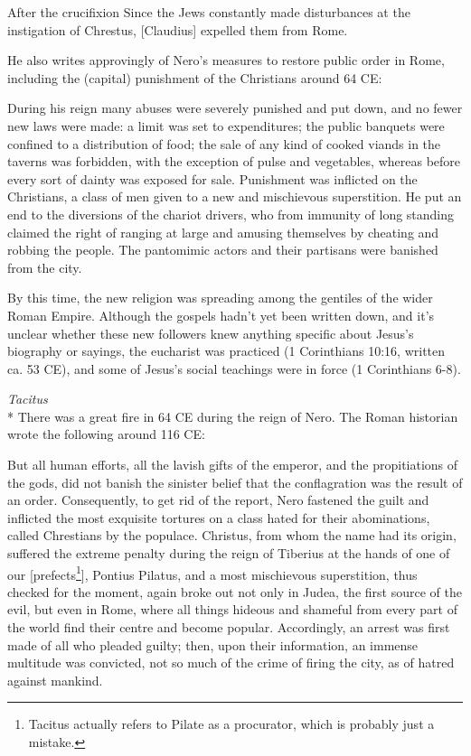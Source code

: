 \documentclass[10pt,a5paper,twoside]{article}
\newcommand{\doimage}[2]{\texttt{[image: \#2]}\label{fig:#2}}
\newcommand{\figbasic}[4]{ %
    \ifthenelse{\isodd{\pageref{fig:#2}}}{}{\hfill}
    \ifstrempty{#3}{
      \doimage{#1}{#2}
    }{
      \makebox{\doimage{#1}{#2} \\ #3}
    }
    \ifthenelse{\isodd{\pageref{fig:#2}}}{\hfill}{}
    \par
}
\newcommand{\fig}[2][0.4]{
  \figbasic{#1}{#2}{}{}
}
\newcommand{\quotesize}{\normalsize{}}
\newcommand{\comm}[1]{\begingroup \color{black!50} #1\endgroup}
\newenvironment{quotetext}{\begingroup\quotesize}{\endgroup}
\newcommand{\intex}[1]{\index[texts]{#1}}
\newcommand{\reftex}[1]{#1\intex{#1}}
\newcommand{\subhead}[1]{\emph{#1}\\*}
\begin{document}
\begin{section}{After the crucifixion}
\begin{quotetext}
Since the Jews constantly made disturbances at the instigation of Chrestus, [Claudius] expelled them from Rome.
\end{quotetext}

\comm{He also writes approvingly of Nero's measures to
restore public order in Rome, including the (capital) punishment of the Christians around 64 CE:}

\begin{quotetext}
During his reign many abuses were severely punished and put down, and
no fewer new laws were made: a limit was set to expenditures; the
public banquets were confined to a distribution of food; the sale of
any kind of cooked viands in the taverns was forbidden, with the
exception of pulse and vegetables, whereas before every sort of dainty
was exposed for sale. Punishment was inflicted on the Christians, a
class of men given to a new and mischievous superstition. He put an
end to the diversions of the chariot drivers, who from immunity of
long standing claimed the right of ranging at large and amusing
themselves by cheating and robbing the people. The pantomimic actors
and their partisans were banished from the city.
\end{quotetext}

\fig[0.6]{nero}

\comm{By this time, the new religion was  spreading among the gentiles of the wider Roman Empire.
Although the gospels hadn't yet been written down, and it's unclear whether
these new followers knew anything specific about Jesus's biography or sayings,
the eucharist was practiced (\reftex{1 Corinthians 10:16}, written ca. 53 CE),
and some of Jesus's social teachings were in force (\reftex{1 Corinthians 6-8}).
}


\subhead{Tacitus}\label{tacitus}%
\comm{There was a great fire in 64 CE during the reign of Nero. The Roman historian wrote the following around 116 CE:}

\begin{quotetext}
But all human efforts, all the lavish gifts of the emperor, and the
propitiations of the gods, did not banish the sinister belief that the
conflagration was the result of an order. Consequently, to get rid of
the report, Nero fastened the guilt and inflicted the most exquisite
tortures on a class hated for their abominations, called Chrestians by
the populace. Christus, from whom the name had its origin, suffered
the extreme penalty during the reign of Tiberius at the hands of one
of our [prefects\footnote{Tacitus actually refers to Pilate as a procurator, which is probably just a mistake.}], Pontius Pilatus, and a most mischievous
superstition, thus checked for the moment, again broke out not only in
Judea, the first source of the evil, but even in Rome, where all
things hideous and shameful from every part of the world find their
centre and become popular. Accordingly, an arrest was first made of
all who pleaded guilty; then, upon their information, an immense
multitude was convicted, not so much of the crime of firing the city,
as of hatred against mankind.
\end{quotetext}


\end{section}
\end{document}
